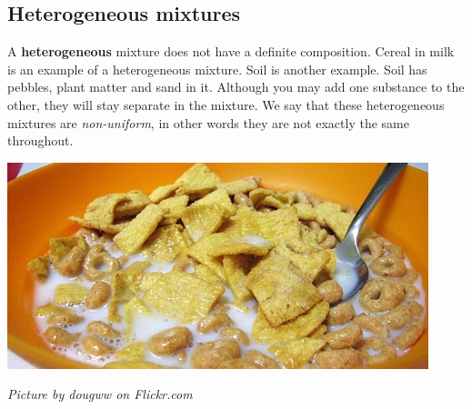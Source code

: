             \subsection*{Heterogeneous mixtures}
            \nopagebreak
        \label{m38708*id62715}A \textbf{heterogeneous} mixture does not have a definite composition. Cereal in milk is an example of a heterogeneous mixture. Soil is another example. Soil has pebbles, plant matter and sand in it. Although you may add one substance to the other, they will stay separate in the mixture. We say that these heterogeneous mixtures are \textsl{non-uniform}, in other words they are not exactly the same throughout.\par 
\begin{minipage}{.5\textwidth}
\begin{center}
 \includegraphics[width=.8\textwidth]{photos/mixtureby-dougww-flickr.jpg}\par
\textit{Picture by dougww on Flickr.com}
\end{center}
\end{minipage}
